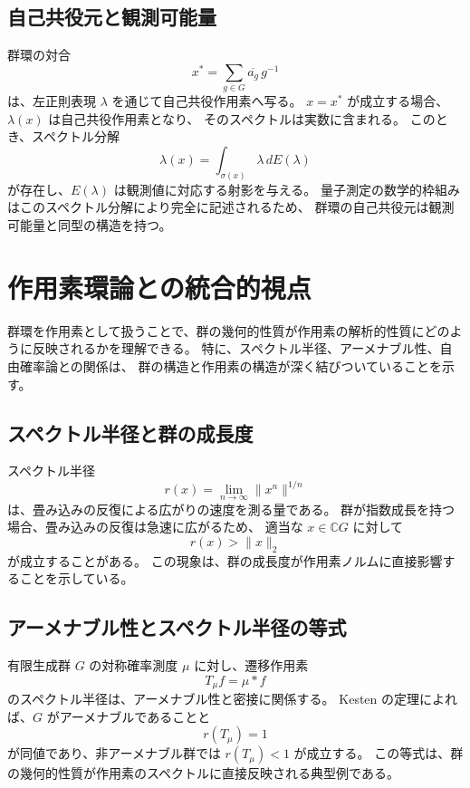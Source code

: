 \documentclass[12pt,a4paper]{ltjarticle}
\theoremstyle{definition}
\begin{document}
\subsection{自己共役元と観測可能量}

群環の対合
\[
x^*=\sum_{g\in G}\overline{a_g}\,g^{-1}
\]
は、左正則表現 $\lambda$ を通じて自己共役作用素へ写る。
$x=x^*$ が成立する場合、$\lambda(x)$ は自己共役作用素となり、
そのスペクトルは実数に含まれる。
このとき、スペクトル分解
\[
\lambda(x)=\int_{\sigma(x)}\lambda\, dE(\lambda)
\]
が存在し、$E(\lambda)$ は観測値に対応する射影を与える。
量子測定の数学的枠組みはこのスペクトル分解により完全に記述されるため、
群環の自己共役元は観測可能量と同型の構造を持つ。

\section{作用素環論との統合的視点}

群環を作用素として扱うことで、群の幾何的性質が作用素の解析的性質にどのように反映されるかを理解できる。
特に、スペクトル半径、アーメナブル性、自由確率論との関係は、
群の構造と作用素の構造が深く結びついていることを示す。

\subsection{スペクトル半径と群の成長度}

スペクトル半径
\[
r(x)=\lim_{n\to\infty}\|x^n\|^{1/n}
\]
は、畳み込みの反復による広がりの速度を測る量である。
群が指数成長を持つ場合、畳み込みの反復は急速に広がるため、
適当な $x\in\mathbb{C}G$ に対して
\[
r(x)>\|x\|_2
\]
が成立することがある。
この現象は、群の成長度が作用素ノルムに直接影響することを示している。

\subsection{アーメナブル性とスペクトル半径の等式}

有限生成群 $G$ の対称確率測度 $\mu$ に対し、遷移作用素
\[
T_\mu f=\mu*f
\]
のスペクトル半径は、アーメナブル性と密接に関係する。
Kesten の定理によれば、$G$ がアーメナブルであることと
\[
r(T_\mu)=1
\]
が同値であり、非アーメナブル群では $r(T_\mu)<1$ が成立する。
この等式は、群の幾何的性質が作用素のスペクトルに直接反映される典型例である。
\end{document}
